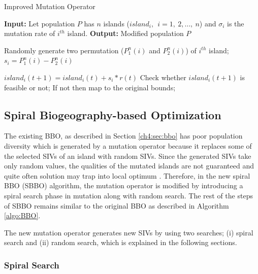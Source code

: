 \begin{algorithm}
\caption{\fontsize{10}{12} \selectfont Improved Mutation Operator}
\label{algo:Emutation1}
\footnotesize
\begin{algorithmic}
\STATE \textbf{Input:}  Let population $P$ has $n$ islands ($island_i,\ \ i=1,\ 2,\dots, \ n$) and $\sigma_i$ is the mutation rate of $i^{th}$ island. 
    \STATE \textbf{Output: } Modified population $P$

     \STATE Randomly generate two permutation ($P^n_1(i)$ and $P^n_2(i)$) of $i^{th}$ island;
\STATE $s_i= P^n_1(i)- P^n_2(i)$

        \STATE $island_i(t+1)=island_i(t)+ s_i*r(t)$
    \STATE Check whether $island_i(t+1)$ is feasible or not;
\STATE If not then map to the original bounds;
\ENDIF

\ENDFOR    


\end{algorithmic}
\end{algorithm}

\subsection{Spiral Biogeography-based Optimization}

The existing BBO, as described in Section \ref{ch4:sec:bbo} has poor population diversity which is generated by a mutation operator because it replaces some of the selected SIVs of an island with random SIVs. Since the generated SIVs take only random values, the qualities of the mutated islands are not guaranteed and quite often solution may trap into local optimum \cite{ma2011, lim2016}. Therefore, in the new spiral BBO (SBBO) algorithm, the mutation operator is modified by introducing a spiral search phase in mutation along with random search. The rest of the steps of SBBO remains similar to the original BBO as described in Algorithm \ref{algo:BBO}. 

The new mutation operator generates new SIVs by using two searches; (i) spiral search and (ii) random search, which is explained in the following sections.  

\subsubsection{Spiral Search}

